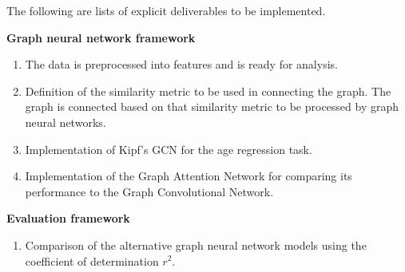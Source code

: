\documentclass[12pt,a4paper,twoside, hidelinks]{article}
\begin{document}

The following are lists of explicit deliverables to be implemented.

\textbf{Graph neural network framework}
\begin{enumerate}[label=G\arabic*.]
  \item The data is preprocessed into features and is ready for analysis. %
  \item Definition of the similarity metric to be used in connecting the graph. The graph is connected based on that similarity metric to be processed by graph neural networks.
  \item Implementation of Kipf's GCN \cite{kipf2017semi} for the age regression task.
  \item Implementation of the Graph Attention Network for comparing its performance to the Graph Convolutional Network.
\end{enumerate}

\textbf{Evaluation framework}

\begin{enumerate}[label=E\arabic*.]
  \item  Comparison of the alternative graph neural network models using the coefficient of determination $r^2$.
\end{enumerate}
\end{document}
